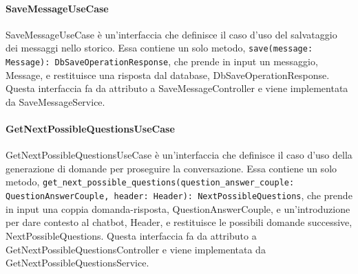 \paragraph{SaveMessageUseCase}
\label{sec:save_message_use_case}
SaveMessageUseCase è un'interfaccia che definisce il caso d'uso del salvataggio dei messaggi nello storico. Essa contiene un solo metodo, \texttt{save(message: Message): DbSaveOperationResponse}, che prende in input un messaggio, Message, e restituisce una risposta dal database, DbSaveOperationResponse. Questa interfaccia fa da attributo a SaveMessageController e viene implementata da SaveMessageService.

\paragraph{GetNextPossibleQuestionsUseCase}
\label{sec:get_next_possible_questions_use_case}
GetNextPossibleQuestionsUseCase è un'interfaccia che definisce il caso d'uso della generazione di domande per proseguire la conversazione. Essa contiene un solo metodo, \texttt{get\_next\_possible\_questions(question\_answer\_couple: QuestionAnswerCouple, header: Header): NextPossibleQuestions}, che prende in input una coppia domanda-risposta, QuestionAnswerCouple, e un'introduzione per dare contesto al chatbot, Header, e restituisce le possibili domande successive, NextPossibleQuestions. Questa interfaccia fa da attributo a GetNextPossibleQuestionsController e viene implementata da GetNextPossibleQuestionsService.

\newpage


\label{sec:service_backend}

